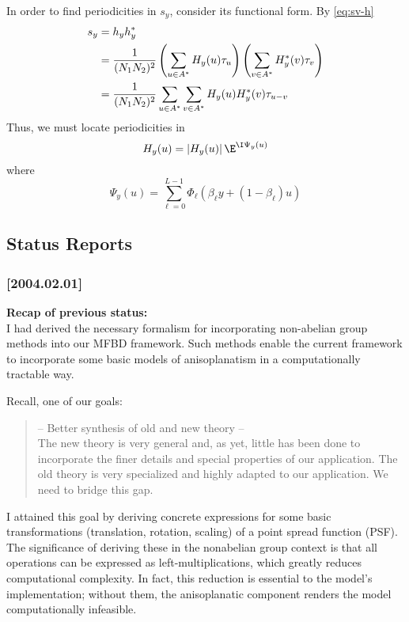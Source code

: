 In order to find periodicities in $s_y$, consider its functional form.  By \ref{eq:sv-h}
\begin{align*}
s_y &=  h_y h_y^*\\
&= \frac{1}{(N_1N_2)^2} \left(\sum_{u\in A^*} H_y(u)\tau_u\right)
\left(\sum_{v\in A^*} H_y^*(v)\tau_v\right)\\
&=\frac{1}{(N_1N_2)^2}\sum_{u\in A^*} \sum_{v\in A^*} H_y(u)H_y^*(v)\tau_{u-v}
\end{align*}
Thus, we must locate periodicities in 
\[
H_y(u) = |H_y(u)|\,\E^{\I \Psi_y(u)}
\]
where 
\[
\Psi_y(u) = \sum_{\ell=0}^{L-1} \Phi_{\ell}(\beta_{\ell}y + (1-\beta_{\ell})u)
\]

\pagebreak


\subsection{Status Reports}
\subsubsection{[2004.02.01]}
{\bf Recap of previous status:}\\
  I had derived the necessary formalism for incorporating 
  non-abelian group methods into our MFBD framework. Such 
  methods enable the current framework to incorporate some 
  basic models of anisoplanatism in a computationally 
  tractable way.

Recall, one of our goals:
\begin{quote}
  -- Better synthesis of old and new theory --\\
  The new theory is very general and, as yet, little has 
  been done to incorporate the finer details and special 
  properties of our application. The old theory is very 
  specialized and highly adapted to our application.  
  We need to bridge this gap.
\end{quote}
I attained this goal by deriving concrete expressions for 
some basic transformations (translation, rotation, scaling) 
of a point spread function (PSF). The significance of 
deriving these in the nonabelian group context is that 
all operations can be expressed as left-multiplications, 
which greatly reduces computational complexity. In fact, 
this reduction is essential to the model's implementation; 
without them, the anisoplanatic component renders the model 
computationally infeasible.

